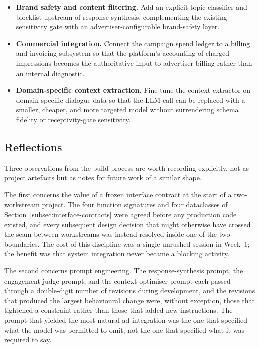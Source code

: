 \begin{itemize}[leftmargin=1.8em]
  \item \textbf{Brand safety and content filtering.} Add an explicit
    topic classifier and blocklist upstream of response synthesis,
    complementing the existing sensitivity gate with an
    advertiser-configurable brand-safety layer.

  \item \textbf{Commercial integration.} Connect the campaign spend
    ledger to a billing and invoicing subsystem so that the
    platform's accounting of charged impressions becomes the
    authoritative input to advertiser billing rather than an internal
    diagnostic.

  \item \textbf{Domain-specific context extraction.} Fine-tune the
    context extractor on domain-specific dialogue data so that the
    LLM call can be replaced with a smaller, cheaper, and
    more targeted model without surrendering schema fidelity or
    receptivity-gate sensitivity.
\end{itemize}

\subsection{Reflections}
\label{subsec:reflections}

Three observations from the build process are worth recording
explicitly, not as project artefacts but as notes for future work of
a similar shape.

The first concerns the value of a frozen interface contract at the
start of a two-workstream project. The four function signatures and
four dataclasses of Section~\ref{subsec:interface-contracts} were
agreed before any production code existed, and every subsequent
design decision that might otherwise have crossed the seam between
workstreams was instead resolved inside one of the two boundaries.
The cost of this discipline was a single unrushed session in Week~1;
the benefit was that system integration never became a blocking
activity.

The second concerns prompt engineering. The response-synthesis prompt,
the engagement-judge prompt, and the context-optimiser prompt each
passed through a double-digit number of revisions during development,
and the revisions that produced the largest behavioural change were,
without exception, those that tightened a constraint rather than
those that added new instructions. The prompt that yielded the most
natural ad integration was the one that specified what the model was
permitted to omit, not the one that specified what it was required to
say.

